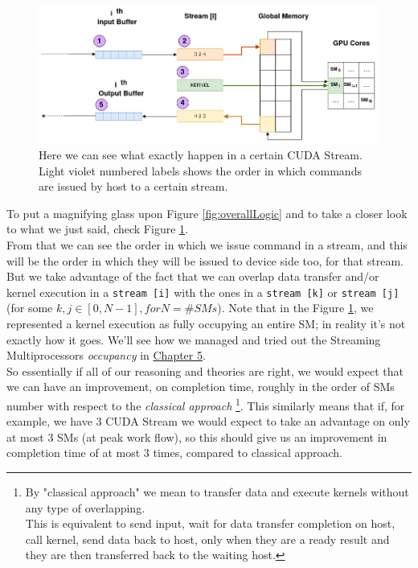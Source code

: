 		\begin{figure}
			\includegraphics[scale=0.56]{images/singleStream.jpg}
			\caption{Here we can see what exactly happen in a certain CUDA Stream. Light violet numbered labels shows the order in which commands are issued by host to a certain stream.}
			\label{fig:singleStream}		
			
		\end{figure}
		
		
		
		To put a magnifying glass upon Figure \ref{fig:overallLogic} and to take a closer look to what we just said, check Figure  \ref{fig:singleStream}.\\
		From that we can see the order in which we issue command in a stream, and this will be the order in which they will be issued to device side too, for that stream.
		But we take advantage of the fact that we can overlap data transfer and/or kernel execution in a \texttt{stream [i]} with the ones in a \texttt{stream [k]} or \texttt{stream [j]} (for some \(k,j \in [0,N-1], for N =\# SMs\)).
		Note that in the Figure \ref{fig:singleStream}, we represented a kernel execution as fully occupying an entire SM; in reality it's not exactly how it goes.
		We'll see how we managed and tried out the Streaming Multiprocessors \textit{occupancy} in \hyperref[chap:experim]{Chapter 5}. \\
		
		So essentially if all of our reasoning and theories are right, we would expect that we can have an improvement, on completion time, roughly in the order of SMs number with respect to the \textit{classical approach} \footnote{By "classical approach" we mean to transfer data and execute kernels without any type of overlapping.\\ This is equivalent to send input, wait for data transfer completion on host, call kernel, send data back to host, only when they are a ready result and they are then transferred back to the waiting host.}.
		This similarly means that if, for example, we have 3 CUDA Stream we would expect to take an advantage on only at most 3 SMs (at peak work flow), so this should give us an improvement in completion time of at most 3 times, compared to classical approach.\\
		
